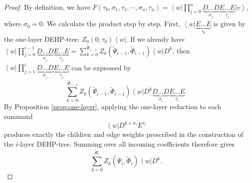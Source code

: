 \documentclass[12pt,a4paper]{amsart}
\newcommand{\bra}[1]{\left\langle #1\right|}
\newcommand{\ket}[1]{\left|#1\right\rangle}
\theoremstyle{remark}
\numberwithin{equation}{section} \numberwithin{theorem}{section}
\begin{document}
\begin{proof}
By definition, we have $F(\tau_0, \sigma_1, \tau_1, \cdots, \sigma_n, \tau_n)=\bra{w}\prod_{j=0}^{n}\underbrace{D \ldots D}_{\sigma_j} \underbrace{E \ldots E}_{\tau_j}\ket{v}$, where $\sigma_0=0$. We calculate the product step by step. First, $\bra{w} \underbrace{E \ldots E}_{\tau_0}$ is given by the one-layer DEHP-tree: $Z_0(0, \tau_0)\bra{w}$. If we already have $\bra{w}\prod_{j=0}^{i-1}\underbrace{D \ldots D}_{\sigma_j} \underbrace{E \ldots E}_{\tau_j}=\sum_{k=0}^{\tilde{\Psi}_{i-1}}Z_k(\tilde{\Psi}_{i-1}, \tilde{\Phi}_{i-1})\bra{w}D^{k}$, then $\bra{w}\prod_{j=1}^{i}\underbrace{D \ldots D}_{\sigma_j} \underbrace{E \ldots E}_{\tau_j}$ can be expressed by
 \[\sum_{k=0}^{\tilde{\Psi}_{i-1}}Z_k(\tilde{\Psi}_{i-1}, \tilde{\Phi}_{i-1})\bra{w}D^{k}\underbrace{D \ldots D}_{\sigma_i} \underbrace{E \ldots E}_{\tau_i}.\]
By Proposition \ref{prop:one-layer}, applying the one-layer reduction to each summand 
\[
\bra{w}D^{k+\sigma_i}E^{\tau_i}
\]
produces exactly the children and edge weights prescribed in the construction of the $i$-layer DEHP-tree. 
Summing over all incoming coefficients therefore gives
\[
\sum_{k=0}^{\tilde{\Psi}_i}Z_k(\tilde{\Psi}_i,\tilde{\Phi}_i)\bra{w}D^k.
\]
\end{proof}
\end{document}
